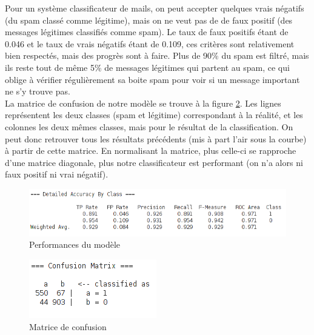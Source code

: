 \begin{homeworkProblem}
\begin{homeworkSection}{2.2}
{			Pour un système classificateur de mails, on peut accepter quelques vrais négatifs (du spam classé comme légitime), mais on ne veut pas de de faux positif (des messages légitimes classifiés comme spam). Le taux de faux positifs étant de 0.046 et le taux de vrais négatifs étant de 0.109, ces critères sont relativement bien respectés, mais des progrès sont à faire. Plus de 90\% du spam est filtré, mais ils reste tout de même 5\% de messages légitimes qui partent au spam, ce qui oblige à vérifier régulièrement sa boite spam pour voir si un message important ne s'y trouve pas.\\
			
			La matrice de confusion de notre modèle se trouve à la figure \ref{matrix}.
			Les lignes représentent les deux classes (spam et légitime) correspondant à la réalité, et les colonnes les deux mêmes classes, mais pour le résultat de la classification. On peut donc retrouver tous les résultats précédents (mis à part l'air sous la courbe) à partir de cette matrice. En normalisant la matrice, plus celle-ci se rapproche d'une matrice diagonale, plus notre classificateur est performant (on n'a alors ni faux positif ni vrai négatif).
			
			}
			
			\begin{figure}[h]
			\begin{center}
			\includegraphics[width=\textwidth]{pictures/accuracy.png}
			\caption{\label{accuracy} Performances du modèle}
			\end{center}
			\end{figure}
			
			\begin{figure}[h]
			\begin{center}
			\includegraphics[]{pictures/confusion_matrix.png}
			\caption{\label{matrix} Matrice de confusion}
			\end{center}
			\end{figure}
			

\end{homeworkSection}
\end{homeworkProblem}
